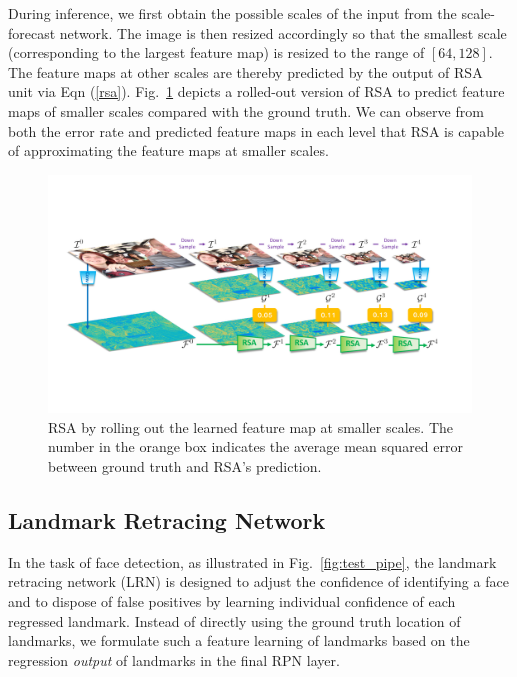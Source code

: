 \documentclass[10pt,twocolumn,letterpaper]{article}
\begin{document}
During inference, we first obtain the possible scales of the input from the scale-forecast network.
The image is then resized accordingly so that the smallest scale (corresponding to the largest feature map) is resized to the range of $[64, 128]$. The feature maps at other scales are thereby predicted by the output of RSA unit via Eqn (\ref{rsa}).
Fig.~\ref{RSA_sample} depicts a rolled-out version of RSA to predict feature maps of smaller scales compared with the ground truth. We can observe  from both the error rate and predicted feature maps in each level that RSA is capable of approximating the feature maps at smaller scales.
\begin{figure}[h]
	\begin{center}
		\includegraphics[width=1\linewidth]{featmapSample.pdf}
	\end{center}
	\caption{RSA %
		by rolling out the learned feature map at smaller scales. The number in the orange box indicates the average mean squared error between ground truth and RSA's prediction.}
	\label{RSA_sample}
	\vspace{-.3cm}
\end{figure}


\subsection{Landmark Retracing  Network}\label{sec:landmark-retracing--network}

In the task of face detection, as illustrated in Fig.~\ref{fig:test_pipe}, the landmark retracing network (LRN) is designed to adjust the confidence  of identifying a face and to dispose of false positives by learning  individual confidence of each regressed landmark. Instead of directly using the ground truth location of landmarks, we formulate such a feature learning of landmarks based on the regression \textit{output} of landmarks in the final RPN layer.
\end{document}
